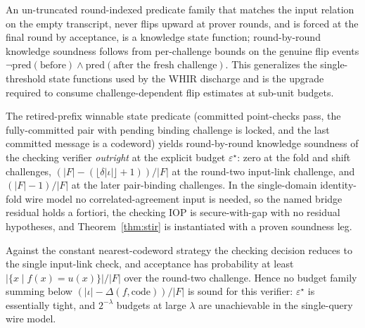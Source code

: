 \begin{theorem}\label{thm:stir_multiflip_ksf}
    An un-truncated round-indexed predicate family that matches the input relation on the
    empty transcript, never flips upward at prover rounds, and is forced at the final round
    by acceptance, is a knowledge state function; round-by-round knowledge soundness follows
    from per-challenge bounds on the genuine flip events
    $\neg\mathrm{pred}(\text{before}) \wedge \mathrm{pred}(\text{after the fresh challenge})$.
    This generalizes the single-threshold state functions used by the WHIR discharge and is
    the upgrade required to consume challenge-dependent flip estimates at sub-unit budgets.
\end{theorem}

\begin{theorem}\label{thm:stir_subunit_discharge}
    The retired-prefix winnable state predicate (committed point-checks pass, the
    fully-committed pair with pending binding challenge is locked, and the last committed
    message is a codeword) yields round-by-round knowledge soundness of the checking
    verifier \emph{outright} at the explicit budget $\varepsilon^\star$: zero at the fold and
    shift challenges, $(|F|-(\lfloor\delta|\iota|\rfloor+1))/|F|$ at the round-two input-link
    challenge, and $(|F|-1)/|F|$ at the later pair-binding challenges.  In the single-domain
    identity-fold wire model no correlated-agreement input is needed, so the named bridge
    residual holds a fortiori, the checking IOP is secure-with-gap with no residual
    hypotheses, and Theorem~\ref{thm:stir} is instantiated with a proven soundness leg.
\end{theorem}

\begin{theorem}\label{thm:stir_switch_attack}
    Against the constant nearest-codeword strategy the checking decision reduces to the
    single input-link check, and acceptance has probability at least
    $|\{x \mid f(x)=u(x)\}|/|F|$ over the round-two challenge.  Hence no budget family
    summing below $(|\iota|-\Delta(f,\mathrm{code}))/|F|$ is sound for this verifier:
    $\varepsilon^\star$ is essentially tight, and $2^{-\lambda}$ budgets at large $\lambda$
    are unachievable in the single-query wire model.
\end{theorem}

